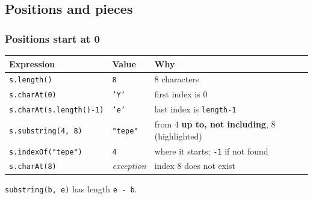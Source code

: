 \documentclass[aspectratio=169,10pt,compress]{beamer}
\begin{document}
\subsection[Index]{Positions and pieces}




\begin{frame}[t,fragile] \frametitle{Positions start at 0}
  \begin{center}
  \end{center}
  \vspace{0.3em}
  \small
  \begin{tabular}{@{}L{0.34\textwidth}L{0.18\textwidth}L{0.4\textwidth}@{}}
    \toprule
    \textbf{Expression}            & \textbf{Value}       & \textbf{Why} \\
    \midrule
    \texttt{s.length()}            & \texttt{8}           & 8 characters \\
    \texttt{s.charAt(0)}           & \texttt{'Y'}         & first index is 0 \\
    \texttt{s.charAt(s.length()-1)}& \texttt{'e'}         & last index is \texttt{length-1} \\
    \texttt{s.substring(4, 8)}     & \texttt{"tepe"}      & from 4 \textbf{up to, not including}, 8 (highlighted) \\
    \texttt{s.indexOf("tepe")}     & \texttt{4}           & where it starts; \texttt{-1} if not found \\
    \texttt{s.charAt(8)}           & \emph{exception}     & index 8 does not exist \\
    \bottomrule
  \end{tabular}

  \vspace{0.4em}
   \texttt{substring(b, e)} has length \texttt{e - b}.
\end{frame}
\end{document}
